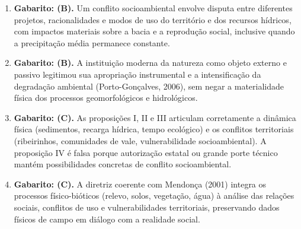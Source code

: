 \begin{boxGabarito}
\begin{enumerate}[leftmargin=1.8em, itemsep=4pt, start=11]
  \item \textbf{Gabarito: (B).} Um conflito socioambiental envolve disputa entre diferentes projetos, racionalidades e modos de uso do território e dos recursos hídricos, com impactos materiais sobre a bacia e a reprodução social, inclusive quando a precipitação média permanece constante.

  \item \textbf{Gabarito: (B).} A instituição moderna da natureza como objeto externo e passivo legitimou sua apropriação instrumental e a intensificação da degradação ambiental (Porto-Gonçalves, 2006), sem negar a materialidade física dos processos geomorfológicos e hidrológicos.

  \item \textbf{Gabarito: (C).} As proposições I, II e III articulam corretamente a dinâmica física (sedimentos, recarga hídrica, tempo ecológico) e os conflitos territoriais (ribeirinhos, comunidades de vale, vulnerabilidade socioambiental). A proposição IV é falsa porque autorização estatal ou grande porte técnico mantém possibilidades concretas de conflito socioambiental.

  \item \textbf{Gabarito: (C).} A diretriz coerente com Mendonça (2001) integra os processos físico-bióticos (relevo, solos, vegetação, água) à análise das relações sociais, conflitos de uso e vulnerabilidades territoriais, preservando dados físicos de campo em diálogo com a realidade social.
\end{enumerate}
\end{boxGabarito}

